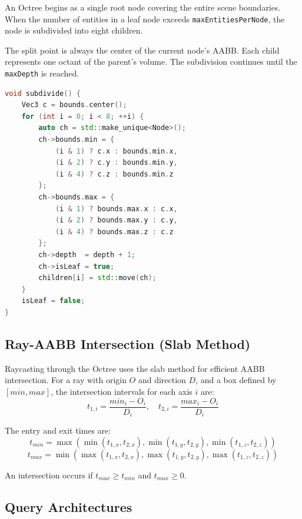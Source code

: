 An Octree begins as a single root node covering the entire scene boundaries. When the number of entities in a leaf node exceeds \texttt{maxEntitiesPerNode}, the node is subdivided into eight children.

The split point is always the center of the current node's AABB. Each child represents one octant of the parent's volume. The subdivision continues until the \texttt{maxDepth} is reached.

\begin{lstlisting}[language=C++, caption=Octree Node Subdivision]
void subdivide() {
    Vec3 c = bounds.center();
    for (int i = 0; i < 8; ++i) {
        auto ch = std::make_unique<Node>();
        ch->bounds.min = {
            (i & 1) ? c.x : bounds.min.x,
            (i & 2) ? c.y : bounds.min.y,
            (i & 4) ? c.z : bounds.min.z
        };
        ch->bounds.max = {
            (i & 1) ? bounds.max.x : c.x,
            (i & 2) ? bounds.max.y : c.y,
            (i & 4) ? bounds.max.z : c.z
        };
        ch->depth  = depth + 1;
        ch->isLeaf = true;
        children[i] = std::move(ch);
    }
    isLeaf = false;
}
\end{lstlisting}

\subsection{Ray-AABB Intersection (Slab Method)}

Raycasting through the Octree uses the slab method for efficient AABB intersection. For a ray with origin $O$ and direction $D$, and a box defined by $[min, max]$, the intersection intervals for each axis $i$ are:
\begin{equation}
    t_{1,i} = \frac{min_i - O_i}{D_i}, \quad t_{2,i} = \frac{max_i - O_i}{D_i}
\end{equation}

The entry and exit times are:
\begin{equation}
    t_{min} = \max(\min(t_{1,x}, t_{2,x}), \min(t_{1,y}, t_{2,y}), \min(t_{1,z}, t_{2,z}))
\end{equation}
\begin{equation}
    t_{max} = \min(\max(t_{1,x}, t_{2,x}), \max(t_{1,y}, t_{2,y}), \max(t_{1,z}, t_{2,z}))
\end{equation}

An intersection occurs if $t_{max} \geq t_{min}$ and $t_{max} \geq 0$.

\subsection{Query Architectures}

